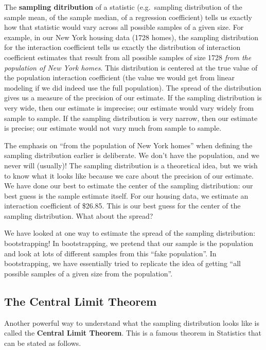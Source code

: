 \documentclass[]{book}
\begin{document}
The \textbf{sampling ditribution} of a statistic (e.g.~sampling distribution of the sample mean, of the sample median, of a regression coefficient) tells us exactly how that statistic would vary across all possible samples of a given size. For example, in our New York housing data (1728 homes), the sampling distribution for the interaction coefficient tells us exactly the distribution of interaction coefficient estimates that result from all possible samples of size 1728 \emph{from the population of New York homes}. This distribution is centered at the true value of the population interaction coefficient (the value we would get from linear modeling if we did indeed use the full population). The spread of the distribution gives us a measure of the precision of our estimate. If the sampling distribution is very wide, then our estimate is imprecise; our estimate would vary widely from sample to sample. If the sampling distribution is very narrow, then our estimate is precise; our estimate would not vary much from sample to sample.

The emphasis on ``from the population of New York homes'' when defining the sampling distribution earlier is deliberate. We don't have the population, and we never will (usually)! The sampling distribution is a theoretical idea, but we wish to know what it looks like because we care about the precision of our estimate. We have done our best to estimate the center of the sampling distribution: our best guess is the sample estimate itself. For our housing data, we estimate an interaction coefficient of \$26.85. This is our best guess for the center of the sampling distribution. What about the spread?

We have looked at one way to estimate the spread of the sampling distribution: bootstrapping! In bootstrapping, we pretend that our sample is the population and look at lots of different samples from this ``fake population''. In bootstrapping, we have essentially tried to replicate the idea of getting ``all possible samples of a given size from the population''.

\hypertarget{the-central-limit-theorem}{%
\subsection{The Central Limit Theorem}\label{the-central-limit-theorem}}

Another powerful way to understand what the sampling distribution looks like is called the \textbf{Central Limit Theorem}. This is a famous theorem in Statistics that can be stated as follows.
\end{document}
